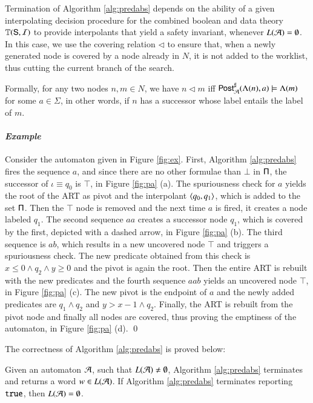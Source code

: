 \documentclass[10pt,conference,letterpaper,twocolumn]{IEEEtran}
\begin{document}
Termination of Algorithm \ref{alg:predabs} depends on the ability of a
given interpolating decision procedure for the combined boolean and
data theory $\mathbb{T}(\mathsf{S},\mathcal{I})$ to provide interpolants that yield a
safety invariant, whenever $L(\mathcal{A}) = \emptyset$. In this case, we use
the covering relation $\lhd$ to ensure that, when a newly generated
node is covered by a node already in $N$, it is not added to the
worklist, thus cutting the current branch of the search. 

Formally, for any two nodes $n,m \in N$, we have $n \lhd m$ iff
${\mathsf{Post}}^\sharp_{\mathcal{A}}(\Lambda(n),a) \models \Lambda(m)$ for some $a \in
\Sigma$, in other words, if $n$ has a successor whose label entails
the label of $m$.

\paragraph{\em Example}
Consider the automaton given in Figure \ref{fig:ex}. First, Algorithm
\ref{alg:predabs} fires the sequence $a$, and since there are no other
formulae than $\bot$ in $\mathsf{\Pi}$, the successor of $\iota \equiv q_0$
is $\top$, in Figure \ref{fig:pa} (a). The spuriousness check for $a$
yields the root of the ART as pivot and the interpolant
$\left\langle q_0,q_1 \right\rangle$, which is added to the set $\mathsf{\Pi}$. Then the $\top$
node is removed and the next time $a$ is fired, it creates a node
labeled $q_1$. The second sequence $aa$ creates a successor node
$q_1$, which is covered by the first, depicted with a dashed arrow, in
Figure \ref{fig:pa} (b). The third sequence is $ab$, which results in
a new uncovered node $\top$ and triggers a spuriousness check. The new
predicate obtained from this check is $x\leq0\wedge q_2 \wedge y\geq0$
and the pivot is again the root. Then the entire ART is rebuilt with
the new predicates and the fourth sequence $aab$ yields an uncovered
node $\top$, in Figure \ref{fig:pa} (c). The new pivot is the endpoint
of $a$ and the newly added predicates are $q_1\wedge q_2$ and $y>x-1
\wedge q_2$. Finally, the ART is rebuilt from the pivot node and
finally all nodes are covered, thus proving the emptiness of the
automaton, in Figure \ref{fig:pa} (d). \qed

The correctness of Algorithm \ref{alg:predabs} is proved below:

\begin{theorem}\label{thm:predabs}
  Given an automaton $\mathcal{A}$, such that $L(\mathcal{A}) \neq \emptyset$, Algorithm
  \ref{alg:predabs} terminates and returns a word $w \in L(\mathcal{A})$. If
  Algorithm \ref{alg:predabs} terminates reporting $\mathtt{true}$, then
  $L(\mathcal{A}) = \emptyset$.
\end{theorem}
\end{document}
